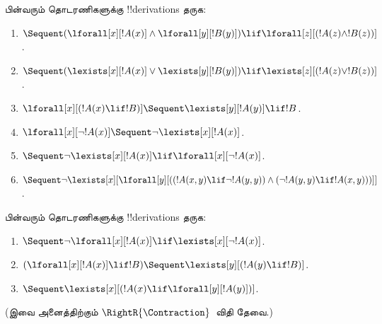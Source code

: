 \documentclass[../../../include/open-logic-section]{subfiles}
\begin{document}
\begin{prob}
பின்வரும் தொடரணிகளுக்கு !!{derivation}s தருக:
\begin{enumerate}
\item $\Sequent (\lforall[x][!A(x)] \land \lforall[y][!B(y)]) \lif
\lforall[z][(!A(z) \land !B(z))]$.
\item $\Sequent (\lexists[x][!A(x)] \lor \lexists[y][!B(y)]) \lif
\lexists[z][(!A(z) \lor !B(z))]$.
\item $\lforall[x][(!A(x) \lif !B)] \Sequent \lexists[y][!A(y)] \lif !B$.
\item $\lforall[x][\lnot !A(x)] \Sequent \lnot\lexists[x][!A(x)]$.
\item $\Sequent \lnot\lexists[x][!A(x)] \lif \lforall[x][\lnot !A(x)]$.
\item $\Sequent \lnot\lexists[x][\lforall[y][((!A(x,y) \lif \lnot
!A(y,y)) \land (\lnot !A(y,y) \lif !A(x,y)))]]$.
\end{enumerate}
\end{prob}

\begin{prob}
பின்வரும் தொடரணிகளுக்கு !!{derivation}s தருக:
\begin{enumerate}
\item $\Sequent \lnot\lforall[x][!A(x)] \lif \lexists[x][\lnot!A(x)]$.
\item $(\lforall[x][!A(x)] \lif !B) \Sequent \lexists[y][(!A(y) \lif !B)]$.
\item $\Sequent \lexists[x][(!A(x) \lif \lforall[y][!A(y)])]$.
\end{enumerate}
(இவை அனைத்திற்கும் $\RightR{\Contraction}$~விதி தேவை.)
\end{prob}
\end{document}
